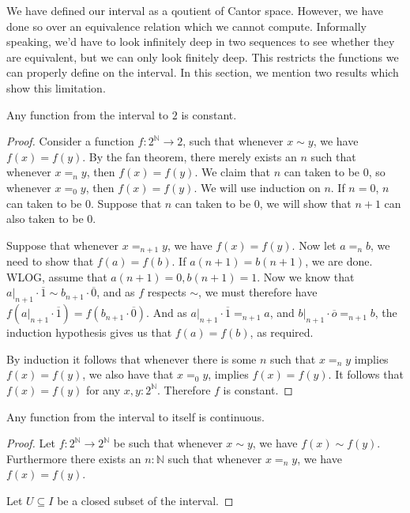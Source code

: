 We have defined our interval as a qoutient of Cantor space. 
However, we have done so over an equivalence relation which we cannot compute. 
Informally speaking, we'd have to look infinitely deep in two sequences to see whether
they are equivalent, but we can only look finitely deep. 
This restricts the functions we can properly define on the interval. 
In this section, we mention two results which show this limitation. 
\begin{lemma}
  Any function from the interval to $2$ is constant. 
\end{lemma}
\begin{proof}
  Consider a function $f: 2^\mathbb N \to 2$, 
  such that whenever $x\sim y$, we have $f(x) = f(y)$. 
  By the fan theorem, there merely exists an $n$ such that 
  whenever $x =_n y$, then $f(x) = f(y)$. 
  We claim that $n$ can taken to be $0$, 
  so whenever $x =_0 y $, then $f(x) = f(y)$. 
  We will use induction on $n$. If $n=0$, $n$ can taken to be $0$. 
  Suppose that $n$ can taken to be $0$, we will show that 
  $n+1$ can also taken to be $0$. 

  Suppose that whenever $x =_{n+1} y$, we have $f(x) = f(y)$. 
  Now let $a =_n b$, we need to show that $f(a) = f(b)$. 
  If $a(n+1) = b(n+1)$, we are done. WLOG, 
  assume that $a(n+1) = 0, b(n+1) = 1$. 
  Now we know that 
  $a|_{n+1} \cdot \overline 1 \sim b_{n+1} \cdot \overline 0$, 
  and as $f$ respects $\sim$, we must therefore have 
  $f(a|_{n+1} \cdot \overline 1)  = f( b_{n+1} \cdot \overline 0)$. 
  And as $a|_{n+1} \cdot \overline 1 =_{n+1} a$, 
  and 
  $b|_{n+1} \cdot \overline o =_{n+1} b$, 
  the induction hypothesis gives us that 
  $f(a)  = f(b)$, as required. 

  By induction it follows that whenever there is some $n$ such that 
  $x=_n y$ implies $f(x) = f(y)$, we also have that 
  $x =_0 y$, implies $f(x) = f(y)$. 
  It follows that $f(x) = f(y)$ for any $x,y : 2^\mathbb N$. 
  Therefore $f$ is constant. 
\end{proof}

\begin{lemma}
  Any function from the interval to itself is continuous. 
\end{lemma}
\begin{proof}
  Let $f: 2^\mathbb N \to 2^\mathbb N$ be such that whenever 
  $x\sim y$, we have $f(x) \sim f(y)$. 
  Furthermore there exists an $n:\mathbb N$ such that whenever 
  $x =_n y$, we have $f(x) = f(y)$. 

  Let $U \subseteq I$ be a closed subset of the interval. 
\end{proof} 
